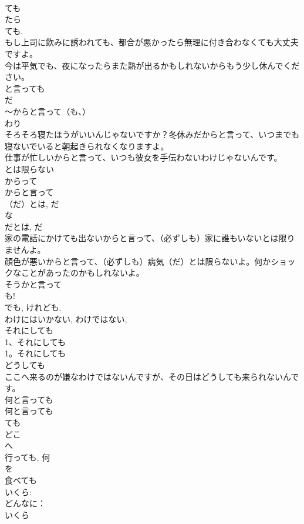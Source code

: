 \documentclass[8pt]{extreport}
\begin{document}
\begin{CJK}{UTF8}{min}
\\	ても 
\\	たら 
\\	ても.
\\	もし上司に飲みに誘われても、都合が悪かったら無理に付き合わなくても大丈夫ですよ。
\\	今は平気でも、夜になったらまた熱が出るかもしれないからもう少し休んでください。
\\	と言っても
\\	だ 
\\	～からと言って（も、）
\\	わり 
\\	そろそろ寝たほうがいいんじゃないですか？冬休みだからと言って、いつまでも寝ないでいると朝起きられなくなりますよ。
\\	仕事が忙しいからと言って、いつも彼女を手伝わないわけじゃないんです。
\\	とは限らない 
\\	からって 
\\	からと言って
\\	（だ）とは, だ 
\\	な
\\	だとは, だ 
\\	家の電話にかけても出ないからと言って、（必ずしも）家に誰もいないとは限りませんよ。
\\	顔色が悪いからと言って、（必ずしも）病気（だ）とは限らないよ。何かショックなことがあったのかもしれないよ。
\\	そうかと言って
\\	も!
\\	でも, けれども. 
\\	わけにはいかない, わけではない, 
\\	それにしても
\\	1、それにしても
\\	1。それにしても
\\	どうしても
\\	ここへ来るのが嫌なわけではないんですが、その日はどうしても来られないんです。
\\	何と言っても
\\	何と言っても
\\	ても
\\	どこ
\\	へ
\\	行っても, 何
\\	を
\\	食べても
\\	いくら: 
\\	どんなに： 
\\	いくら 

\end{CJK}
\end{document}
